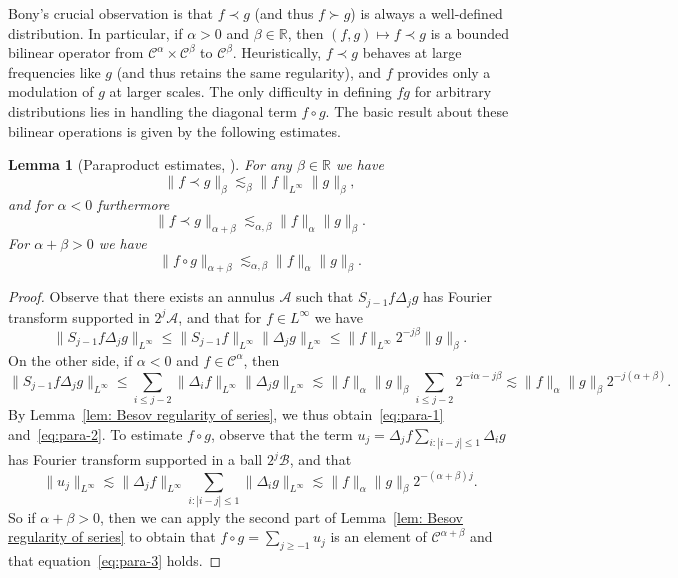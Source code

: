 \documentclass[11pt,a4paper]{article}
\newtheorem{lemma}[theorem]{Lemma}
\theoremstyle{remark}
\newcommand{\CA}{\ensuremath{\mathscr{A}}}
\newcommand{\CB}{\ensuremath{\mathscr{B}}}
\newcommand{\CC}{\ensuremath{\mathscr{C}}}
\begin{document}
Bony's crucial observation is that $f \prec g$ (and thus $f \succ g$) is always a well-defined distribution. In particular, if $\alpha >0$ and $\beta \in \mathbb{R}$, then $( f,g ) \mapsto f \prec g$ is a bounded bilinear operator from $\CC^{\alpha} \times \CC^{\beta}$ to $\CC^{\beta}$. Heuristically, $f \prec g$ behaves at large frequencies like $g$ (and thus retains the same regularity), and $f$ provides only a modulation of $g$ at larger scales. The only difficulty in defining $fg$ for arbitrary distributions lies in handling the diagonal term $f \circ g$. The basic result about these bilinear operations is given by the following estimates.

\begin{lemma}[Paraproduct estimates, \cite{Bony1981}]\label{thm:paraproduct}
   For any $\beta \in \mathbb{R}$ we have
   \begin{equation} \label{eq:para-1}
       \| f \prec g \|_{\beta} \lesssim_{\beta} \| f \|_{L^{\infty}} \| g \|_{\beta} ,
   \end{equation}
   and for $\alpha <0$ furthermore
   \begin{equation}\label{eq:para-2}
      \| f \prec g \|_{\alpha + \beta} \lesssim_{\alpha , \beta} \| f \|_{\alpha} \| g \|_{\beta}.
   \end{equation}
   For $\alpha + \beta >0$ we have
   \begin{equation}\label{eq:para-3}
      \| f \circ g \|_{\alpha + \beta} \lesssim_{\alpha , \beta} \| f \|_{\alpha} \| g \|_{\beta}.
    \end{equation}
\end{lemma}

\begin{proof}
  Observe that there exists an annulus $\CA$ such that $S_{j-1} f \Delta_{j} g$ has Fourier transform supported in $2^{j} \CA$, and that for $f \in L^{\infty}$ we have
  \[
     \| S_{j-1} f \Delta_{j} g \|_{L^{\infty}} \leqslant \| S_{j-1} f  \|_{L^{\infty}} \| \Delta_{j} g \|_{L^{\infty}} \leqslant \| f \|_{L^{\infty}} 2^{-j \beta} \| g \|_{\beta}.
  \]
  On the other side, if $\alpha <0$ and $f \in \CC^{\alpha}$, then
  \[
     \| S_{j-1} f \Delta_{j} g \|_{L^{\infty}} \leqslant \sum_{i \leqslant j-2} \| \Delta_{i} f \|_{L^{\infty}} \| \Delta_{j} g \|_{L^{\infty}} \lesssim \| f \|_{\alpha} \| g \|_{\beta} \sum_{i \leqslant j-2} 2^{-i\alpha -j \beta} \lesssim \| f \|_{\alpha} \| g \|_{\beta} 2^{-j ( \alpha + \beta )} .
  \]
  By Lemma~\ref{lem: Besov regularity of series}, we thus obtain~{\eqref{eq:para-1}} and~{\eqref{eq:para-2}}. To estimate $f \circ g$, observe that the term $u_{j} = \Delta_{j} f \sum_{i: | i-j | \leqslant 1} \Delta_{i} g$ has Fourier transform supported in a ball $2^{j} \CB$, and that
  \[
     \| u_{j} \|_{L^{\infty}} \lesssim \| \Delta_{j} f \|_{L^{\infty}} \sum_{i: | i-j | \leqslant 1} \| \Delta_{i} g \|_{L^{\infty}} \lesssim \| f \|_{\alpha} \| g \|_{\beta} 2^{- ( \alpha + \beta ) j}.
  \]
  So if $\alpha + \beta >0$, then we can apply the second part of Lemma~\ref{lem: Besov regularity of series} to obtain that $f \circ g= \sum_{j \geqslant -1} u_{j}$ is an element of $\CC^{\alpha + \beta}$ and that equation~{\eqref{eq:para-3}} holds.
\end{proof}
\end{document}
